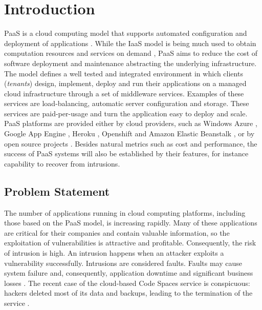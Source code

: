 \chapter{Introduction}\label{chapter:introduction}
\ac{PaaS} is a cloud computing model that supports automated configuration and deployment of applications \cite{Vaquero2008,Vaquero2011,Armbrust,Mell}. While the \ac{IaaS} model is being much used to obtain computation resources and services on demand \cite{Lenk2009,Armbrust}, \ac{PaaS} aims to reduce the cost of software deployment and maintenance abstracting the underlying infrastructure. The model defines a well tested and integrated environment in which clients (\textit{tenants}) design, implement, deploy and run their applications on a managed cloud infrastructure through a set of middleware services. Examples of these services are load-balancing, automatic server configuration and storage. These services are paid-per-usage and turn the application easy to deploy and scale.
\ac{PaaS} platforms are provided either by cloud providers, such as Windows Azure \cite{azure}, Google App Engine \cite{GoogleAppEngine}, Heroku \cite{Heroku}, Openshift \cite{OpenShift} and Amazon Elastic Beanstalk \cite{AmazonElasticBeanstalk}, or by open source projects \cite{Appscale,Cloudfoundry,ApacheStratos}. Besides natural metrics such as cost and performance, the success of \ac{PaaS} systems will also be established by their features, for instance capability to recover from intrusions.


\section{Problem Statement}\label{sec:introduction:problem}
The number of applications running in cloud computing platforms, including those based on the \ac{PaaS} model, is increasing rapidly. 
Many of these applications are critical for their companies and contain valuable information, so the exploitation of vulnerabilities is attractive and profitable. Consequently, the risk of intrusion is high. An intrusion happens when an attacker exploits a vulnerability successfully. Intrusions are considered faults. Faults may cause system failure and, consequently, application downtime and significant business losses \cite{Patterson2002a}. The recent case of the cloud-based Code Spaces service is conspicuous: hackers deleted most of its data and backups, leading to the termination of the service \cite{McAllister:14}. 

